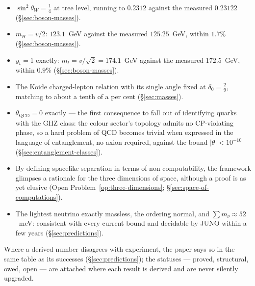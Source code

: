\begin{itemize}
\item $\sin^{2}\theta_{W} = \tfrac14$ at tree level, running to $0.2312$ against the measured
      $0.23122$ (\S\ref{sec:boson-masses}).
\item $m_{H} = v/2$: $123.1$~GeV against the measured $125.25$~GeV, within $1.7\%$
      (\S\ref{sec:boson-masses}).
\item $y_{t} = 1$ exactly: $m_{t} = v/\sqrt{2} = 174.1$~GeV against the measured $172.5$~GeV,
      within $0.9\%$ (\S\ref{sec:boson-masses}).
\item The Koide charged-lepton relation with its single angle fixed at $\delta_{0} = \tfrac29$,
      matching to about a tenth of a per cent (\S\ref{sec:masses}).
\item $\theta_{\mathrm{QCD}} = 0$ exactly --- the first consequence to fall out of identifying
      quarks with the GHZ class: the colour sector's topology admits no CP-violating phase, so a
      hard problem of QCD becomes trivial when expressed in the language of entanglement, no axion
      required, against the bound $\lvert\theta\rvert < 10^{-10}$
      (\S\ref{sec:entanglement-classes}).
\item By defining spacelike separation in terms of non-computability, the framework glimpses a
      rationale for the three dimensions of space, although a proof is as yet elusive
      (Open Problem~\ref{op:three-dimensions}; \S\ref{sec:space-of-computations}).
\item The lightest neutrino exactly massless, the ordering normal, and
      $\sum m_{\nu} \approx 52$~meV: consistent with every current bound and decidable by JUNO
      within a few years (\S\ref{sec:predictions}).
\end{itemize}

Where a derived number disagrees with experiment, the paper says so in the same table as its
successes (\S\ref{sec:predictions}); the statuses --- proved, structural, owed, open --- are
attached where each result is derived and are never silently upgraded.

